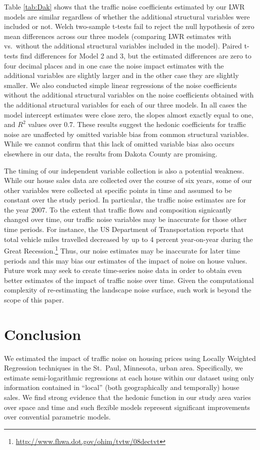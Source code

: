\documentclass{article}\usepackage{graphicx, color}
\begin{document}
Table \ref{tab:Dak} shows that the traffic noise coefficients estimated by our LWR models are similar regardless of whether the additional structural variables were included or not. Welch two-sample t-tests fail to reject the null hypothesis of zero mean differences across our three models (comparing LWR estimates with vs.\ without the additional structural variables included in the model). Paired t-tests find differences for Model 2 and 3, but the estimated differences are zero to four decimal places and in one case the noise impact estimates with the additional variables are slightly larger and in the other case they are slightly smaller. We also conducted simple linear regressions of the noise coefficients without the additional structural variables on the noise coefficients obtained with the additional structural variables for each of our three models. In all cases the model intercept estimates were close zero, the slopes almost exactly equal to one, and $R^2$ values over 0.7. These results suggest the hedonic coefficients for traffic noise are unaffected by omitted variable bias from common structural variables. While we cannot confirm that this lack of omitted variable bias also occurs elsewhere in our data, the results from Dakota County are promising. 

The timing of our independent variable collection is also a potential weakness. While our house sales data are collected over the course of six years, some of our other variables were collected at specific points in time and assumed to be constant over the study period. In particular, the traffic noise estimates are for the year 2007. To the extent that traffic flows and composition signicantly changed over time, our traffic noise variables may be inaccurate for those other time periods. For instance, the US Department of Transportation reports that total vehicle miles travelled decreased by up to 4 percent year-on-year during the Great Recession.\footnote{\url{http://www.fhwa.dot.gov/ohim/tvtw/08dectvt}} Thus, our noise estimates may be inaccurate for later time periods and this may bias our estimates of the impact of noise on house values. Future work may seek to create time-series noise data in order to obtain even better estimates of the impact of traffic noise over time. Given the computational complexity of re-estimating the landscape noise surface, such work is beyond the scope of this paper.

\section{Conclusion}
We estimated the impact of traffic noise on housing prices using Locally Weighted Regression techniques in the St.\ Paul, Minnesota, urban area. Specifically, we estimate semi-logarithmic regressions at each house within our dataset using only information contained in ``local'' (both geographically and temporally) house sales. We find strong evidence that the hedonic function in our study area varies over space and time and such flexible models represent significant improvements over convential parametric models. 
\end{document}

